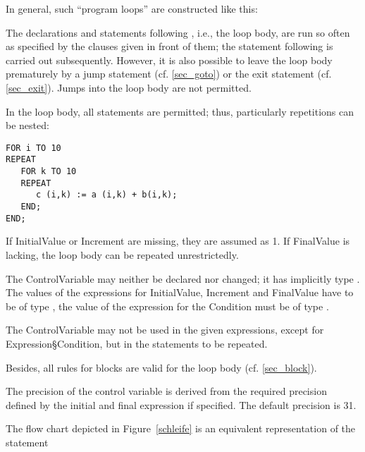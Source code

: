 In general, such ``program loops'' are constructed like this:

\begin{grammarframe}


\end{grammarframe}
The declarations and statements following , i.e., the loop body,
are run so often as specified by the clauses given in front of them; the
statement following  is carried out subsequently. However, it is also
possible to leave the loop body prematurely by a jump statement (cf. \ref{sec_goto})
or the exit statement (cf. \ref{sec_exit}). Jumps into the loop body are not permitted.

In the loop body, all statements are permitted; thus, particularly
repetitions can be nested:

\begin{lstlisting}
FOR i TO 10
REPEAT
   FOR k TO 10 
   REPEAT 
      c (i,k) := a (i,k) + b(i,k);
   END;
END;
\end{lstlisting}

If InitialValue or Increment are missing, they are assumed as 1. 
If FinalValue is lacking, the loop body can be repeated unrestrictedly.

The ControlVariable may neither be declared nor changed; it has
implicitly type . The values of the expressions for InitialValue,
Increment and FinalValue have to be of type , the value of the
expression for the Condition must be of type .

The ControlVariable may not be used in the given expressions, except
for Expression\S Condition, but in the statements to be repeated.

Besides, all rules for blocks are valid for the loop body (cf. \ref{sec_block}).

The precision of the control variable is derived from the
required precision defined by the initial and final expression if %
specified.
The default precision is 31.

The flow chart depicted in Figure~\ref{schleife} is an equivalent representation of the
statement

